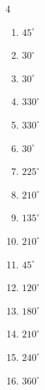 \begin{multicols}{4}
\begin{enumerate}
  \item $\displaystyle 45^{\circ}$

  \item $\displaystyle 30^{\circ}$

  \item $\displaystyle 30^{\circ}$

  \item $\displaystyle 330^{\circ}$

  \item $\displaystyle 330^{\circ}$

  \item $\displaystyle 30^{\circ}$

  \item $\displaystyle 225^{\circ}$

  \item $\displaystyle 210^{\circ}$

  \item $\displaystyle 135^{\circ}$

  \item $\displaystyle 210^{\circ}$

  \item $\displaystyle 45^{\circ}$

  \item $\displaystyle 120^{\circ}$

  \item $\displaystyle 180^{\circ}$
        \phantom{$\displaystyle =\pi$}

  \item $\displaystyle 210^{\circ}$

  \item $\displaystyle 240^{\circ}$

  \item $\displaystyle 360^{\circ}$
        \phantom{$\displaystyle =2\pi$}


\end{enumerate}
\end{multicols}
